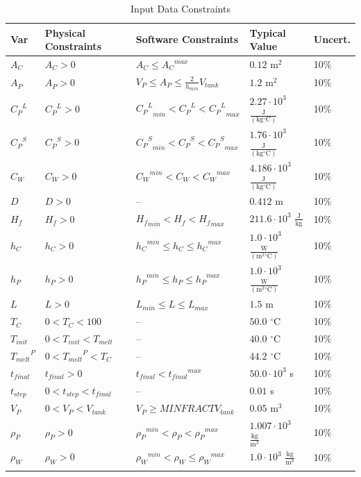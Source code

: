\documentclass[12pt]{article}
\begin{document}
\begin{longtable}{l l l l l}
\toprule
Var & Physical Constraints & Software Constraints & Typical Value & Uncert.
\\
\midrule
\endhead
${A_{C}}$ & ${A_{C}}>0$ & ${A_{C}}\leq{}{{A_{C}}^{max}}$ & $0.12$ $\text{m}^{2}$ & 10$\%$
\\
${A_{P}}$ & ${A_{P}}>0$ & ${V_{P}}\leq{}{A_{P}}\leq{}\frac{2}{{h_{min}}} {V_{tank}}$ & $1.2$ $\text{m}^{2}$ & 10$\%$
\\
${{C_{P}}^{L}}$ & ${{C_{P}}^{L}}>0$ & ${{{C_{P}}^{L}}_{min}}<{{C_{P}}^{L}}<{{{C_{P}}^{L}}_{max}}$ & $2.27\cdot{}10^{3}$ $\frac{\text{J}}{(\text{kg}{}^{\circ}\text{C})}$ & 10$\%$
\\
${{C_{P}}^{S}}$ & ${{C_{P}}^{S}}>0$ & ${{{C_{P}}^{S}}_{min}}<{{C_{P}}^{S}}<{{{C_{P}}^{S}}_{max}}$ & $1.76\cdot{}10^{3}$ $\frac{\text{J}}{(\text{kg}{}^{\circ}\text{C})}$ & 10$\%$
\\
${C_{W}}$ & ${C_{W}}>0$ & ${{C_{W}}^{min}}<{C_{W}}<{{C_{W}}^{max}}$ & $4.186\cdot{}10^{3}$ $\frac{\text{J}}{(\text{kg}{}^{\circ}\text{C})}$ & 10$\%$
\\
$D$ & $D>0$ & -- & $0.412$ m & 10$\%$
\\
${H_{f}}$ & ${H_{f}}>0$ & ${{H_{f}}_{min}}<{H_{f}}<{{H_{f}}_{max}}$ & $211.6\cdot{}10^{3}$ $\frac{\text{J}}{\text{kg}}$ & 10$\%$
\\
${h_{C}}$ & ${h_{C}}>0$ & ${{h_{C}}^{min}}\leq{}{h_{C}}\leq{}{{h_{C}}^{max}}$ & $1.0\cdot{}10^{3}$ $\frac{\text{W}}{(\text{m}^{2}{}^{\circ}\text{C})}$ & 10$\%$
\\
${h_{P}}$ & ${h_{P}}>0$ & ${{h_{P}}^{min}}\leq{}{h_{P}}\leq{}{{h_{P}}^{max}}$ & $1.0\cdot{}10^{3}$ $\frac{\text{W}}{(\text{m}^{2}{}^{\circ}\text{C})}$ & 10$\%$
\\
$L$ & $L>0$ & ${L_{min}}\leq{}L\leq{}{L_{max}}$ & $1.5$ m & 10$\%$
\\
${T_{C}}$ & $0<{T_{C}}<100$ & -- & $50.0$ ${}^{\circ}$C & 10$\%$
\\
${T_{init}}$ & $0<{T_{init}}<{T_{melt}}$ & -- & $40.0$ ${}^{\circ}$C & 10$\%$
\\
${{T_{melt}}^{P}}$ & $0<{{T_{melt}}^{P}}<{T_{C}}$ & -- & $44.2$ ${}^{\circ}$C & 10$\%$
\\
${t_{final}}$ & ${t_{final}}>0$ & ${t_{final}}<{{t_{final}}^{max}}$ & $50.0\cdot{}10^{3}$ s & 10$\%$
\\
${t_{step}}$ & $0<{t_{step}}<{t_{final}}$ & -- & $0.01$ s & 10$\%$
\\
${V_{P}}$ & $0<{V_{P}}<{V_{tank}}$ & ${V_{P}}\geq{}MINFRACT {V_{tank}}$ & $0.05$ $\text{m}^{3}$ & 10$\%$
\\
${ρ_{P}}$ & ${ρ_{P}}>0$ & ${{ρ_{P}}^{min}}<{ρ_{P}}<{{ρ_{P}}^{max}}$ & $1.007\cdot{}10^{3}$ $\frac{\text{kg}}{\text{m}^{3}}$ & 10$\%$
\\
${ρ_{W}}$ & ${ρ_{W}}>0$ & ${{ρ_{W}}^{min}}<{ρ_{W}}\leq{}{{ρ_{W}}^{max}}$ & $1.0\cdot{}10^{3}$ $\frac{\text{kg}}{\text{m}^{3}}$ & 10$\%$
\\
\bottomrule
\caption{Input Data Constraints}
\label{Table:InDataConstraints}
\end{longtable}
\end{document}
